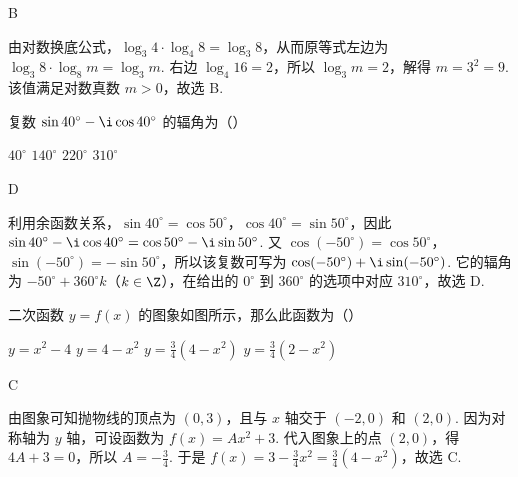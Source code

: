 \begin{answer}
B
\end{answer}

\begin{solution}
由对数换底公式，\(\log_3 4\cdot\log_4 8=\log_3 8\)，从而原等式左边为 \(\log_3 8\cdot\log_8m=\log_3m\). 右边 \(\log_4 16=2\)，所以 \(\log_3m=2\)，解得 \(m=3^2=9\). 该值满足对数真数 \(m>0\)，故选 B.
\end{solution}

\begin{problem}
复数 \(\sin 40^\circ - \i\cos 40^\circ\) 的辐角为（\quad）

\choices
    {\(40^\circ\)}
    {\(140^\circ\)}
    {\(220^\circ\)}
    {\(310^\circ\)}
\end{problem}

\begin{answer}
D
\end{answer}

\begin{solution}
利用余函数关系，\(\sin40^\circ=\cos50^\circ\)，\(\cos40^\circ=\sin50^\circ\)，因此 \(\sin40^\circ-\i\cos40^\circ=\cos50^\circ-\i\sin50^\circ\). 又 \(\cos(-50^\circ)=\cos50^\circ\)，\(\sin(-50^\circ)=-\sin50^\circ\)，所以该复数可写为 \(\cos(-50^\circ)+\i\sin(-50^\circ)\). 它的辐角为 \(-50^\circ+360^\circ k\)（\(k\in\Z\)），在给出的 \(0^\circ\) 到 \(360^\circ\) 的选项中对应 \(310^\circ\)，故选 D.
\end{solution}

\begin{problem}
二次函数 \(y = f(x)\) 的图象如图所示，那么此函数为（\quad）


\choices
    {\(y = x^2 - 4\)}
    {\(y = 4 - x^2\)}
    {\(y = \frac{3}{4}\left(4 - x^2\right)\)}
    {\(y = \frac{3}{4}\left(2 - x^2\right)\)}
\end{problem}

\begin{answer}
C
\end{answer}

\begin{solution}
由图象可知抛物线的顶点为 \((0,3)\)，且与 \(x\) 轴交于 \((-2,0)\) 和 \((2,0)\). 因为对称轴为 \(y\) 轴，可设函数为 \(f(x)=Ax^2+3\). 代入图象上的点 \((2,0)\)，得 \(4A+3=0\)，所以 \(A=-\frac34\). 于是 \(f(x)=3-\frac34x^2=\frac34\left(4-x^2\right)\)，故选 C.
\end{solution}

